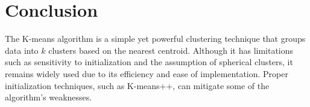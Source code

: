 \documentclass{article}
\begin{document}
\section{Conclusion}

The K-means algorithm is a simple yet powerful clustering technique that groups data into $k$ clusters based on the nearest centroid. Although it has limitations such as sensitivity to initialization and the assumption of spherical clusters, it remains widely used due to its efficiency and ease of implementation. Proper initialization techniques, such as K-means++, can mitigate some of the algorithm's weaknesses.
\end{document}
